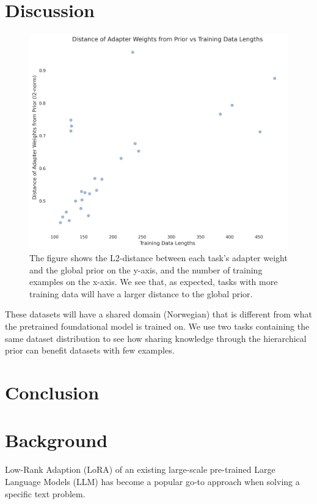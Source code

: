\documentclass{article}
\begin{document}
\section{Discussion}
\begin{figure}[h]
    \centering
    \includegraphics[width=\textwidth]{figures/weights_vs_data_lengths.png}
    \caption{The figure shows the L2-distance between each task's adapter weight and the global prior on the y-axis, and the number of training examples on the x-axis. We see that, as expected, tasks with more training data will have a larger distance to the global prior.}
    \label{fig:weights_vs_datalen} 
\end{figure}


These datasets will have a shared domain (Norwegian) that is different from what the pretrained foundational model is trained on.
We use two tasks containing the same dataset distribution to see how sharing knowledge through the hierarchical prior can benefit datasets with few examples.


\section{Conclusion}

\section*{Background}
Low-Rank  Adaption (LoRA) of an existing large-scale pre-trained Large Language Models (LLM) \cite{hu_lora_2021} has become a popular go-to approach when solving a specific text problem.
\end{document}
